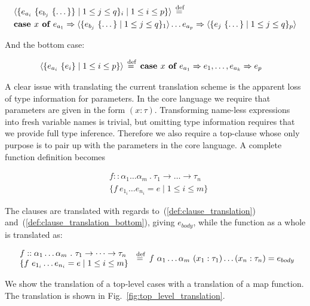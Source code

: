 \begin{align}
  &\langle \{ e_{a_i}~\{ e_{b_j}~\{ \dots \} \} \mid 1 \le j \le q \}_i \mid 1 \le i \le p \} \rangle \stackrel{\>\text{def}}{=}\>   \label{def:clause_translation} \\
  &\textbf{case } x \textbf{ of } e_{a_1} \Rightarrow \langle \{ e_{b_j}~\{ \dots \} \mid 1 \le j \le q \}_1 \rangle \dots e_{a_p} \Rightarrow \langle \{ e_j~\{ \dots \} \mid 1 \le j \le q \}_p \rangle \nonumber
\end{align}

And the bottom case:

\begin{align}
  &\langle \{ e_{a_i}~\{ e_i \} \mid 1 \le i \le p \} \rangle \stackrel{\>\text{def}}{=}\>
  \textbf{case } x \textbf{ of } e_{a_1} \Rightarrow e_1, \dots, e_{a_k} \Rightarrow e_p
\label{def:clause_translation_bottom}
\end{align}

A clear issue with translating the current translation scheme is the apparent
loss of type information for parameters. In the core language we require that
parameters are given in the form $(x:\tau)$. Transforming name-less expressions
into fresh variable names is trivial, but omitting type information requires
that we provide full type inference. Therefore we also require a top-clause
whose only purpose is to pair up with the parameters in the core language. A
complete function definition becomes

\begin{align*}
  &f :: \alpha_1 \dots \alpha_m~.~\tau_1 \rightarrow \dots \rightarrow \tau_n \\
  &\{ f~e_{1_i} \dots e_{n_i} = e \mid 1 \le i \le m \}
\end{align*}

The clauses are translated with regards to~(\ref{def:clause_translation})
and~(\ref{def:clause_translation_bottom}), giving $e_{body}$, while the
function as a whole is translated as:

\begin{align*}
  \begin{array}{l}
    f :: \alpha_1 \dots \alpha_m~.~\tau_1 \rightarrow \dots \rightarrow \tau_n \\
    \{ f~e_{1_i} \dots e_{n_i} = e \mid 1 \le i \le m \}
  \end{array} \stackrel{\>\text{def}}{=}\>
  f~\alpha_1 \dots \alpha_m~(x_1: \tau_1) \dots (x_n: \tau_n) = e_{body}
\end{align*}

We show the translation of a top-level cases with a translation of a map
function. The translation is shown in Fig.~\ref{fig:top_level_translation}.

